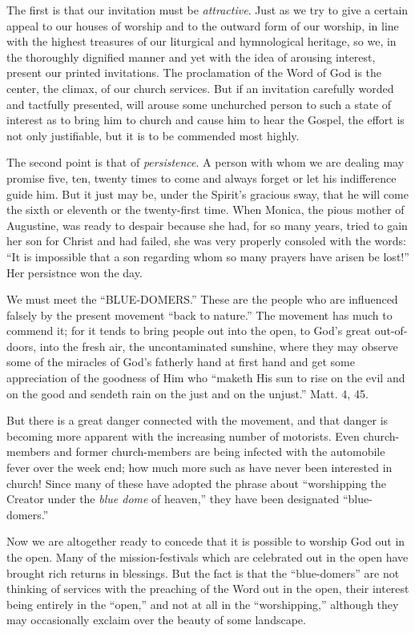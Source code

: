 \documentclass[
]{book}
\begin{document}
The first is that our invitation must be \emph{attractive}. Just as we try to give a certain appeal to our houses of worship and to the outward form of our worship, in line with the highest treasures of our liturgical and hymnological heritage, so we, in the thoroughly dignified manner and yet with the idea of arousing interest, present our printed invitations. The proclamation of the Word of God is the center, the climax, of our church services. But if an invitation carefully worded and tactfully presented, will arouse some unchurched person to such a state of interest as to bring him to church and cause him to hear the Gospel, the effort is not only justifiable, but it is to be commended most highly.

The second point is that of \emph{persistence}. A person with whom we are dealing may promise five, ten, twenty times to come and always forget or let his indifference guide him. But it just may be, under the Spirit's gracious sway, that he will come the sixth or eleventh or the twenty-first time. When Monica, the pious mother of Augustine, was ready to despair because she had, for so many years, tried to gain her son for Christ and had failed, she was very properly consoled with the words: ``It is impossible that a son regarding whom so many prayers have arisen be lost!'' Her persistnce won the day.

We must meet the ``BLUE-DOMERS.'' These are the people who are influenced falsely by the present movement ``back to nature.'' The movement has much to commend it; for it tends to bring people out into the open, to God's great out-of-doors, into the fresh air, the uncontaminated sunshine, where they may observe some of the miracles of God's fatherly hand at first hand and get some appreciation of the goodness of Him who ``maketh His sun to rise on the evil and on the good and sendeth rain on the just and on the unjust.'' Matt. 4, 45.

But there is a great danger connected with the movement, and that danger is becoming more apparent with the increasing number of motorists. Even church-members and former church-members are being infected with the automobile fever over the week end; how much more such as have never been interested in church! Since many of these have adopted the phrase about ``worshipping the Creator under the \emph{blue dome} of heaven,'' they have been designated ``blue-domers.''

Now we are altogether ready to concede that it is possible to worship God out in the open. Many of the mission-festivals which are celebrated out in the open have brought rich returns in blessings. But the fact is that the ``blue-domers'' are not thinking of services with the preaching of the Word out in the open, their interest being entirely in the ``open,'' and not at all in the ``worshipping,'' although they may occasionally exclaim over the beauty of some landscape.
\end{document}
